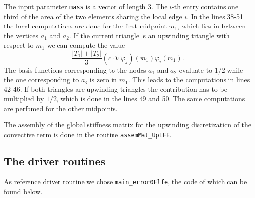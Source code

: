 The input parameter \texttt{mass} is a vector of length $3$. The $i$-th entry contains one third of the area of the two elements sharing the local edge $i$. In the lines 38-51 the local computations are done for the first midpoint $m_1$, which lies in between the vertices $a_1$ and $a_2$. If the current triangle is an upwinding triangle with respect to $m_1$ we can compute the value
\begin{equation}
 \frac{|T_1|+|T_2|}{3} (c \cdot \nabla \varphi_j)(m_1)\varphi_i(m_1).
\end{equation}
The basis functions corresponding to the nodes $a_1$ and $a_2$ evaluate to $1/2$ while the one corresponding to $a_3$ is zero in $m_1$. This leads to the computations in lines 42-46. If both triangles are upwinding triangles the contribution has to be multiplied by $1/2$, which is done in the lines 49 and 50. The same computations are perfomed for the other midpoints.

The assembly of the global stiffness matrix for the upwinding discretization of the convective term is done in the routine \texttt{assemMat\_UpLFE}.


\subsection{The driver routines}

As reference driver routine we chose \texttt{main\_error0Flfe}, the code of which can be found below.

